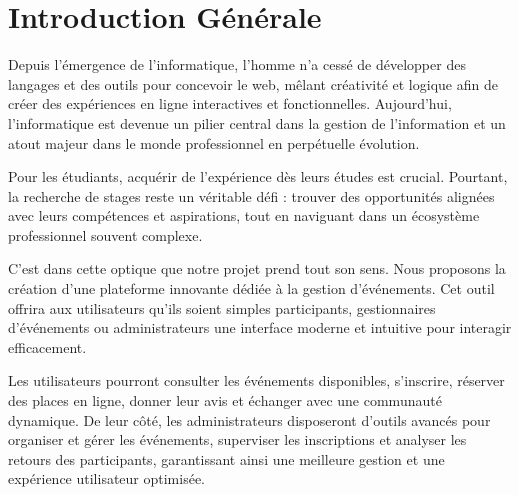 \chapter*{Introduction Générale}


Depuis l’émergence de l’informatique, l’homme n’a cessé de développer des langages et des outils pour concevoir le web, mêlant créativité et logique afin de créer des expériences en ligne interactives et fonctionnelles. Aujourd’hui, l’informatique est devenue un pilier central dans la gestion de l’information et un atout majeur dans le monde professionnel en perpétuelle évolution.

Pour les étudiants, acquérir de l’expérience dès leurs études est crucial. Pourtant, la recherche de stages reste un véritable défi : trouver des opportunités alignées avec leurs compétences et aspirations, tout en naviguant dans un écosystème professionnel souvent complexe.

C’est dans cette optique que notre projet prend tout son sens. Nous proposons la création d’une plateforme innovante dédiée à la gestion d’événements. Cet outil offrira aux utilisateurs qu’ils soient simples participants, gestionnaires d’événements ou administrateurs une interface moderne et intuitive pour interagir efficacement.

Les utilisateurs pourront consulter les événements disponibles, s’inscrire, réserver des places en ligne, donner leur avis et échanger avec une communauté dynamique. De leur côté, les administrateurs disposeront d’outils avancés pour organiser et gérer les événements, superviser les inscriptions et analyser les retours des participants, garantissant ainsi une meilleure gestion et une expérience utilisateur optimisée.